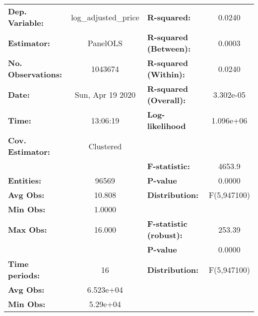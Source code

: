 \documentclass{report}
\begin{document}
\begin{center}
\begin{tabular}{lclc}
\toprule
\textbf{Dep. Variable:}                          & log\_adjusted\_price & \textbf{  R-squared:         }   &      0.0240      \\
\textbf{Estimator:}                              &       PanelOLS       & \textbf{  R-squared (Between):}  &      0.0003      \\
\textbf{No. Observations:}                       &       1043674        & \textbf{  R-squared (Within):}   &      0.0240      \\
\textbf{Date:}                                   &   Sun, Apr 19 2020   & \textbf{  R-squared (Overall):}  &    3.302e-05     \\
\textbf{Time:}                                   &       13:06:19       & \textbf{  Log-likelihood     }   &    1.096e+06     \\
\textbf{Cov. Estimator:}                         &      Clustered       & \textbf{                     }   &                  \\
\textbf{}                                        &                      & \textbf{  F-statistic:       }   &      4653.9      \\
\textbf{Entities:}                               &        96569         & \textbf{  P-value            }   &      0.0000      \\
\textbf{Avg Obs:}                                &        10.808        & \textbf{  Distribution:      }   &   F(5,947100)    \\
\textbf{Min Obs:}                                &        1.0000        & \textbf{                     }   &                  \\
\textbf{Max Obs:}                                &        16.000        & \textbf{  F-statistic (robust):} &      253.39      \\
\textbf{}                                        &                      & \textbf{  P-value            }   &      0.0000      \\
\textbf{Time periods:}                           &          16          & \textbf{  Distribution:      }   &   F(5,947100)    \\
\textbf{Avg Obs:}                                &      6.523e+04       & \textbf{                     }   &                  \\
\textbf{Min Obs:}                                &       5.29e+04       & \textbf{                     }   &                  \\

\end{tabular}
\end{center}
\end{document}
